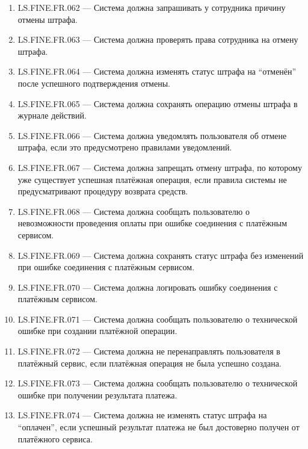 \documentclass[12pt,a4paper]{article}
\begin{document}
\begin{enumerate}
		\item LS.FINE.FR.062 --- Система должна запрашивать у сотрудника причину отмены
		штрафа.
		
		\item LS.FINE.FR.063 --- Система должна проверять права сотрудника на отмену штрафа.
		
		\item LS.FINE.FR.064 --- Система должна изменять статус штрафа на ``отменён''
		после успешного подтверждения отмены.
		
		\item LS.FINE.FR.065 --- Система должна сохранять операцию отмены штрафа в журнале
		действий.
		
		\item LS.FINE.FR.066 --- Система должна уведомлять пользователя об отмене штрафа,
		если это предусмотрено правилами уведомлений.
		
		\item LS.FINE.FR.067 --- Система должна запрещать отмену штрафа, по которому уже
		существует успешная платёжная операция, если правила системы не предусматривают
		процедуру возврата средств.
		
		\item LS.FINE.FR.068 --- Система должна сообщать пользователю о невозможности
		проведения оплаты при ошибке соединения с платёжным сервисом.
		
		\item LS.FINE.FR.069 --- Система должна сохранять статус штрафа без изменений при
		ошибке соединения с платёжным сервисом.
		
		\item LS.FINE.FR.070 --- Система должна логировать ошибку соединения с платёжным
		сервисом.
		
		\item LS.FINE.FR.071 --- Система должна сообщать пользователю о технической ошибке
		при создании платёжной операции.
		
		\item LS.FINE.FR.072 --- Система должна не перенаправлять пользователя в платёжный
		сервис, если платёжная операция не была успешно создана.
		
		\item LS.FINE.FR.073 --- Система должна сообщать пользователю о технической ошибке
		при получении результата платежа.
		
		\item LS.FINE.FR.074 --- Система должна не изменять статус штрафа на ``оплачен'',
		если успешный результат платежа не был достоверно получен от платёжного сервиса.
		

\end{enumerate}
\end{document}

